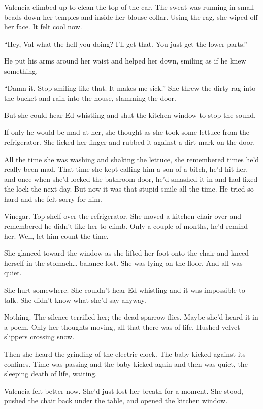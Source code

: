 \documentclass[
]{article}
\begin{document}
Valencia climbed up to clean the top of the car. The sweat was running
in small beads down her temples and inside her blouse collar. Using the
rag, she wiped off her face. It felt cool now.

``Hey, Val what the hell you doing? I'll get that. You just get the
lower parts.''

He put his arms around her waist and helped her down, smiling as if he
knew something.

``Damn it. Stop smiling like that. It makes me sick.'' She threw the
dirty rag into the bucket and rain into the house, slamming the door.

But she could hear Ed whistling and shut the kitchen window to stop the
sound.

If only he would be mad at her, she thought as she took some lettuce
from the refrigerator. She licked her finger and rubbed it against a
dirt mark on the door.

All the time she was washing and shaking the lettuce, she remembered
times he'd really been mad. That time she kept calling him a
son-of-a-bitch, he'd hit her, and once when she'd locked the bathroom
door, he'd smashed it in and had fixed the lock the next day. But now it
was that stupid smile all the time. He tried so hard and she felt sorry
for him.

Vinegar. Top shelf over the refrigerator. She moved a kitchen chair over
and remembered he didn't like her to climb. Only a couple of months,
he'd remind her. Well, let him count the time.

She glanced toward the window as she lifted her foot onto the chair and
kneed herself in the stomach\ldots{} balance lost. She was lying on the
floor. And all was quiet.

She hurt somewhere. She couldn't hear Ed whistling and it was impossible
to talk. She didn't know what she'd say anyway.

Nothing. The silence terrified her; the dead sparrow flies. Maybe she'd
heard it in a poem. Only her thoughts moving, all that there was of
life. Hushed velvet slippers crossing snow.

Then she heard the grinding of the electric clock. The baby kicked
against its confines. Time was passing and the baby kicked again and
then was quiet, the sleeping death of life, waiting.

Valencia felt better now. She'd just lost her breath for a moment. She
stood, pushed the chair back under the table, and opened the kitchen
window.
\end{document}

